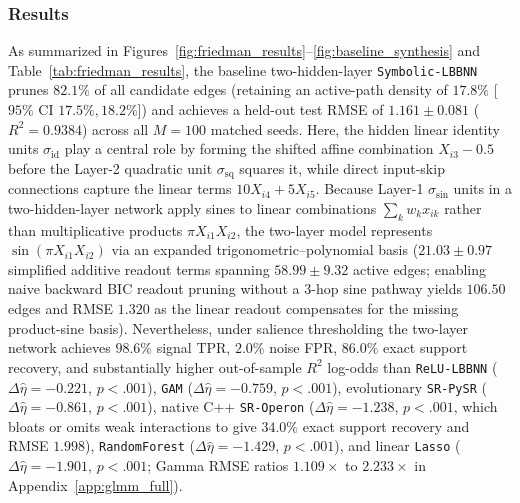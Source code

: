 \documentclass[11pt,a4paper]{article}
\begin{document}
\subsubsection{Results}
As summarized in Figures~\ref{fig:friedman_results}--\ref{fig:baseline_synthesis} and Table~\ref{tab:friedman_results}, the baseline two-hidden-layer \texttt{Symbolic-LBBNN} prunes $82.1\%$ of all candidate edges (retaining an active-path density of $17.8\%$ [$95\%$ CI $17.5\%, 18.2\%$]) and achieves a held-out test RMSE of $1.161 \pm 0.081$ ($R^2 = 0.9384$) across all $M = 100$ matched seeds. Here, the hidden linear identity units $\sigma_{\text{id}}$ play a central role by forming the shifted affine combination $X_{i3} - 0.5$ before the Layer-2 quadratic unit $\sigma_{\text{sq}}$ squares it, while direct input-skip connections capture the linear terms $10 X_{i4} + 5 X_{i5}$. Because Layer-1 $\sigma_{\sin}$ units in a two-hidden-layer network apply sines to linear combinations $\sum_k w_k x_{ik}$ rather than multiplicative products $\pi X_{i1} X_{i2}$, the two-layer model represents $\sin(\pi X_{i1} X_{i2})$ via an expanded trigonometric--polynomial basis ($21.03 \pm 0.97$ simplified additive readout terms spanning $58.99 \pm 9.32$ active edges; enabling naive backward BIC readout pruning without a 3-hop sine pathway yields $106.50$ edges and RMSE $1.320$ as the linear readout compensates for the missing product-sine basis). Nevertheless, under salience thresholding the two-layer network achieves $98.6\%$ signal TPR, $2.0\%$ noise FPR, $86.0\%$ exact support recovery, and substantially higher out-of-sample $R^2$ log-odds than \texttt{ReLU-LBBNN} ($\Delta\hat{\eta} = -0.221$, $p < .001$), \texttt{GAM} ($\Delta\hat{\eta} = -0.759$, $p < .001$), evolutionary \texttt{SR-PySR} ($\Delta\hat{\eta} = -0.861$, $p < .001$), native C++ \texttt{SR-Operon} ($\Delta\hat{\eta} = -1.238$, $p < .001$, which bloats or omits weak interactions to give $34.0\%$ exact support recovery and RMSE $1.998$), \texttt{RandomForest} ($\Delta\hat{\eta} = -1.429$, $p < .001$), and linear \texttt{Lasso} ($\Delta\hat{\eta} = -1.901$, $p < .001$; Gamma RMSE ratios $1.109\times$ to $2.233\times$ in Appendix~\ref{app:glmm_full}).
\end{document}
